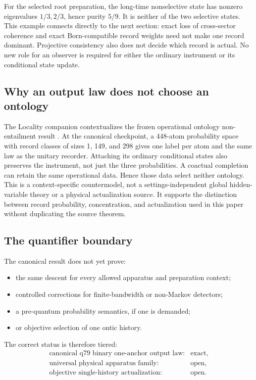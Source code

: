 \documentclass[11pt]{article}
\begin{document}
For the selected root preparation, the long-time nonselective state has
nonzero eigenvalues \(1/3,2/3\), hence purity \(5/9\). It is neither of the
two selective states. This example connects directly to the next section:
exact loss of cross-sector coherence and exact Born-compatible record
weights need not make one record dominant. Projective consistency also does
not decide which record is actual. No new role for an observer is required
for either the ordinary instrument or its conditional state update.

\subsection{Why an output law does not choose an ontology}
\label{sec:ontology-consumer}
The Locality companion contextualizes the frozen operational ontology
non-entailment result \cite{LocalityCompanion,FrozenOntology}. At the
canonical checkpoint, a 448-atom probability space with record classes of
sizes 1, 149, and 298 gives one label per atom and the same law as the unitary
recorder. Attaching its ordinary conditional states also preserves the
instrument, not just the three probabilities. A coactual completion can
retain the same operational data. Hence those data select neither ontology.
This is a context-specific countermodel, not a settings-independent global
hidden-variable theory or a physical actualization source. It supports the
distinction between record probability, concentration, and actualization
used in this paper without duplicating the source theorem.

\subsection{The quantifier boundary}

The canonical result does not yet prove:
\begin{itemize}
\item the same descent for every allowed apparatus and preparation context;
\item controlled corrections for finite-bandwidth or non-Markov detectors;
\item a pre-quantum probability semantics, if one is demanded;
\item or objective selection of one ontic history.
\end{itemize}

The correct status is therefore tiered:
\[
\begin{array}{ll}
\text{canonical q79 binary one-anchor output law:}&\text{exact},\\
\text{universal physical apparatus family:}&\text{open},\\
\text{objective single-history actualization:}&\text{open}.
\end{array}
\]
\end{document}
